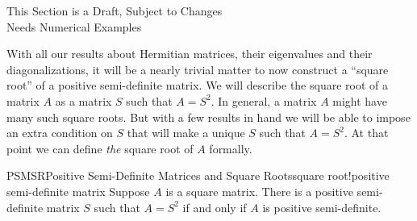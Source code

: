 %
{\sc\large This Section is a Draft, Subject to Changes}\\
{\sc\large Needs Numerical Examples}\par\bigskip
%
With all our results about Hermitian matrices, their eigenvalues and their diagonalizations, it will be a nearly trivial matter to now construct a ``square root'' of a positive semi-definite matrix.  We will describe the square root of a matrix $A$ as a matrix $S$ such that $A=S^2$.  In general, a matrix $A$ might have many such square roots.  But with a few results in hand we will be able to impose an extra condition on $S$ that will make a unique $S$ such that $A=S^2$.  At that point we can define {\em the} square root of $A$ formally.
%
%
\begin{theorem}{PSMSR}{Positive Semi-Definite Matrices and Square Roots}{square root!positive semi-definite matrix}
Suppose $A$ is a square matrix.  There is a positive semi-definite matrix $S$ such that $A=S^2$ if and only if $A$ is positive semi-definite.
\end{theorem}
%
